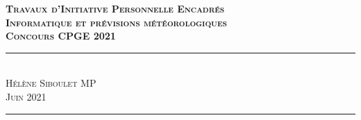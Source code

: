 \documentclass[11pt,a4paper]{article}
\makeatletter
\renewcommand\tableofcontents{%
    \@starttoc{toc}%
}
\makeatother
\begin{document}
\renewcommand{\tablename}{\textsc{Tableau}} 
\begin{flushleft}
\Large \textcolor{BrickRed}{\textsc{\textbf{Travaux d'Initiative Personnelle Encadrés}}} \\
\Huge \textcolor{BrickRed}{\textsc{\textbf{Informatique et prévisions météorologiques }}} \\[0.5cm]
\Large \textcolor{BrickRed}{\textsc{\textbf{Concours CPGE 2021 \\[0.5 cm]}}}
\hrule \textcolor{White}{-} \\[0.1cm]
\Large \textsc{Hélène Siboulet MP} \\
\Large \textsc{Juin 2021} \\[0.5cm]
\hrule
\end{flushleft}
\tableofcontents
\end{document}
